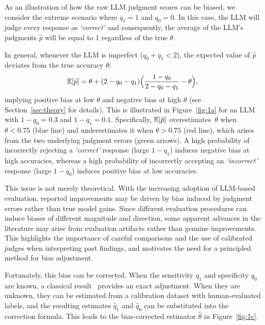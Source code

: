 As an illustration of how the raw LLM judgment scores can be biased, we consider the extreme scenario where $q_1 = 1$ and $q_0 = 0$. In this case, the LLM will judge every response as \emph{`correct'} and consequently, the average of the LLM’s judgments $\hat{p}$ will be equal to $1$ regardless of the true $\theta$.

In general, whenever the LLM is imperfect ($q_0 + q_1 < 2$), the expected value of $\hat{p}$ deviates from the true accuracy $\theta$:
\begin{align}
    \displaystyle \mathbb{E}[\hat{p}]
    = \theta + (2 - q_0 - q_1) \Big( \frac{1 - q_0}{2 - q_0 - q_1} - \theta \Big),
\end{align}
implying positive bias at low $\theta$ and negative bias at high $\theta$ (see Section~\ref{sec:theory} for details).
This is illustrated in Figure~\ref{fig:1a} for an LLM with $1-q_0 = 0.3$ and $1-q_1 = 0.1$. 
Specifically, $\displaystyle \mathbb{E}[\hat{p}]$ overestimates~$\theta$ when $\theta < 0.75$ (\textcolor{myblue}{{blue line}}) and underestimates it when $\theta > 0.75$ (\textcolor{myred}{{red line}}), which arises from the two underlying judgment errors (\textcolor{mygreen}{{green arrows}}). A high probability of incorrectly rejecting a \emph{`correct'} response (large $1 - q_1$) induces negative bias at high accuracies, whereas a high probability of incorrectly accepting an \emph{`incorrect'} response (large $1 - q_0$) induces positive bias at low accuracies.

This issue is not merely theoretical. With the increasing adoption of LLM-based evaluation, reported improvements may be driven by bias induced by judgment errors rather than true model gains. Since different evaluation procedures can induce biases of different magnitude and direction, some apparent advances in the literature may arise from evaluation artifacts rather than genuine improvements. This highlights the importance of careful comparisons and the use of calibrated judges when interpreting past findings, and motivates the need for a principled method for bias adjustment.


Fortunately, this bias can be corrected. When the sensitivity $q_1$ and specificity $q_0$ are known, a classical result~\citep{rogan1978estimating} provides an exact adjustment. When they are unknown, they can be estimated from a calibration dataset with human-evaluated labels, and the resulting estimates $\hat{q}_1$ and $\hat{q}_0$ can be substituted into the correction formula. This leads to the bias-corrected estimator $\hat{\theta}$ in Figure~\ref{fig:1c}.

